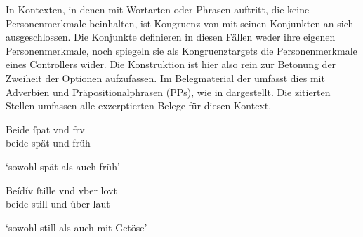 In Kontexten, in denen  mit Wortarten oder Phrasen
auftritt, die keine Personenmerkmale beinhalten, ist Kongruenz von
 mit seinen Konjunkten an sich ausgeschlossen. Die Konjunkte
definieren in diesen Fällen weder ihre eigenen Personen\-merkmale, noch
spiegeln sie als Kongruenztargets die Personenmerkmale eines Controllers wider.
Die Konstruktion ist hier also rein zur Betonung der Zweiheit der Optionen
aufzufassen. Im Belegmaterial der \KC{} umfasst dies  mit Adverbien und Präpositionalphrasen (PPs), wie in
 dargestellt. Die zitierten Stellen
umfassen alle exzerptierten Belege für diesen Kontext.

\begin{exe}
\ex \label{ex:syntintvar1}
	\begin{xlist}
	\ex \begin{taggedline}{\parencites[\pno~18rb,5]{kc:B1}[vgl.~abweichend][6289]{schroeder1895}}
	\end{taggedline}

	\ex \begin{taggedline}{\parencites[\pno~19va,15]{kc:B1}[zu][6834--6839]{schroeder1895}}
	\end{taggedline}

	\ex \label{ex:syntintvar1_3}
	\gll Beide ſpat vnd frv \\
		beide spät und früh \\
	\begin{taggedline}{\parencites[\pno~33ra,36]{kc:VB}[zu][6834--6839]{schroeder1895}}
	\trans `sowohl spät als auch früh'
	\end{taggedline}
\end{xlist}

\ex \label{ex:syntintvar3}
	\begin{xlist}
	\ex \begin{taggedline}{\parencites[\pno~22va,1]{kc:B1}[zu][8014--8020]{schroeder1895}}
	\end{taggedline}

	\ex \label{ex:syntintvar3_2}
		\gll Beídív ſtille vnd vber lovt \\
		beide still und über laut \\
	\begin{taggedline}{\parencites[\pno~38vb,24]{kc:VB}[zu][8014--8020]{schroeder1895}}
	\trans `sowohl still als auch mit Getöse'
	\end{taggedline}
\end{xlist}
\end{exe}

